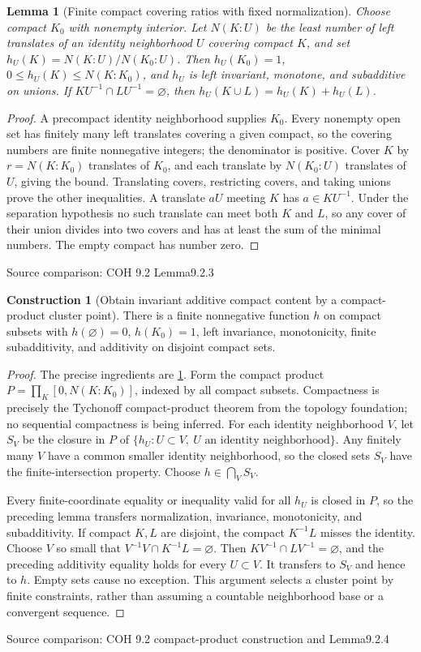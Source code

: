 \documentclass[11pt,oneside,openany]{book}
\newtheorem{lemma}[theorem]{Lemma}
\theoremstyle{definition}
\newtheorem{construction}[theorem]{Construction}
\theoremstyle{remark}
\newcounter{foundation}\renewcommand{\thefoundation}{F\arabic{foundation}}
\newcommand{\family}[1]{}
\newcommand{\source}[1]{\par\begingroup\small\sffamily\color{black!65}Source comparison: #1\par\endgroup}
\begin{document}
\begin{lemma}[Finite compact covering ratios with fixed normalization]\family{D11.21.compact_covering_ratios}\label{d11:21:compact-covering-ratios}
Choose compact $K_0$ with nonempty interior. Let $N(K:U)$ be the least number of left translates of an identity neighborhood $U$ covering compact $K$, and set $h_U(K)=N(K:U)/N(K_0:U)$. Then $h_U(K_0)=1$, $0\le h_U(K)\le N(K:K_0)$, and $h_U$ is left invariant, monotone, and subadditive on unions. If $KU^{-1}\cap LU^{-1}=\varnothing$, then $h_U(K\cup L)=h_U(K)+h_U(L)$.
\end{lemma}
\begin{proof}
A precompact identity neighborhood supplies $K_0$. Every nonempty open set has finitely many left translates covering a given compact, so the covering numbers are finite nonnegative integers; the denominator is positive. Cover $K$ by $r=N(K:K_0)$ translates of $K_0$, and each translate by $N(K_0:U)$ translates of $U$, giving the bound. Translating covers, restricting covers, and taking unions prove the other inequalities. A translate $aU$ meeting $K$ has $a\in KU^{-1}$. Under the separation hypothesis no such translate can meet both $K$ and $L$, so any cover of their union divides into two covers and has at least the sum of the minimal numbers. The empty compact has number zero.
\end{proof}
\source{COH 9.2 Lemma9.2.3}

\begin{construction}[Obtain invariant additive compact content by a compact-product cluster point]\family{D11.21.compact_content_cluster}\label{d11:21:compact-content-cluster}
There is a finite nonnegative function $h$ on compact subsets with $h(\varnothing)=0$, $h(K_0)=1$, left invariance, monotonicity, finite subadditivity, and additivity on disjoint compact sets.
\end{construction}
\begin{proof}
The precise ingredients are \cref{d11:21:compact-covering-ratios}. Form the compact product $P=\prod_K[0,N(K:K_0)]$, indexed by all compact subsets. Compactness is precisely the Tychonoff compact-product theorem from the topology foundation; no sequential compactness is being inferred. For each identity neighborhood $V$, let $S_V$ be the closure in $P$ of $\{h_U:U\subset V,\ U\text{ an identity neighborhood}\}$. Any finitely many $V$ have a common smaller identity neighborhood, so the closed sets $S_V$ have the finite-intersection property. Choose $h\in\bigcap_VS_V$.

Every finite-coordinate equality or inequality valid for all $h_U$ is closed in $P$, so the preceding lemma transfers normalization, invariance, monotonicity, and subadditivity. If compact $K,L$ are disjoint, the compact $K^{-1}L$ misses the identity. Choose $V$ so small that $V^{-1}V\cap K^{-1}L=\varnothing$. Then $KV^{-1}\cap LV^{-1}=\varnothing$, and the preceding additivity equality holds for every $U\subset V$. It transfers to $S_V$ and hence to $h$. Empty sets cause no exception. This argument selects a cluster point by finite constraints, rather than assuming a countable neighborhood base or a convergent sequence.
\end{proof}
\source{COH 9.2 compact-product construction and Lemma9.2.4}
\end{document}

